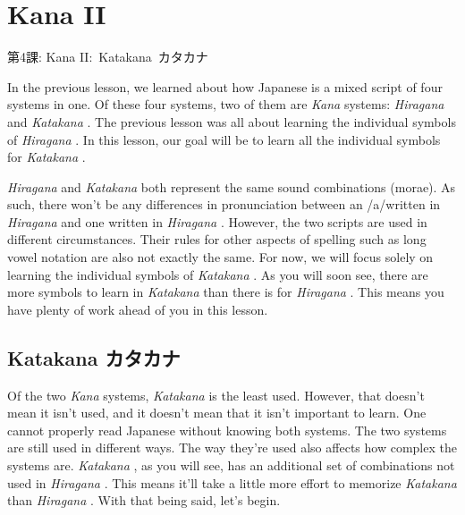    
\chapter{Kana II}

\begin{center}
\begin{Large}
第4課: Kana II: Katakana カタカナ  
\end{Large}
\end{center}
 
\par{ In the previous lesson, we learned about how Japanese is a mixed script of four systems in one. Of these four systems, two of them are \emph{Kana }systems: \emph{Hiragana }and \emph{Katakana }. The previous lesson was all about learning the individual symbols of \emph{Hiragana }. In this lesson, our goal will be to learn all the individual symbols for \emph{Katakana }. }

\par{ \emph{Hiragana }and \emph{Katakana }both represent the same sound combinations (morae). As such, there won't be any differences in pronunciation between an \slash a\slash  written in \emph{Hiragana }and one written in \emph{Hiragana }. However, the two scripts are used in different circumstances. Their rules for other aspects of spelling such as long vowel notation are also not exactly the same. For now, we will focus solely on learning the individual symbols of \emph{Katakana }. As you will soon see, there are more symbols to learn in \emph{Katakana }than there is for \emph{Hiragana }. This means you have plenty of work ahead of you in this lesson. }
      
\section{Katakana カタカナ}
 
\par{ Of the two \emph{Kana }systems, \emph{Katakana }is the least used. However, that doesn't mean it isn't used, and it doesn't mean that it isn't important to learn. One cannot properly read Japanese without knowing both systems. The two systems are still used in different ways. The way they're used also affects how complex the systems are. \emph{Katakana }, as you will see, has an additional set of combinations not used in \emph{Hiragana }. This means it'll take a little more effort to memorize \emph{Katakana }than \emph{Hiragana }. With that being said, let's begin.  }


